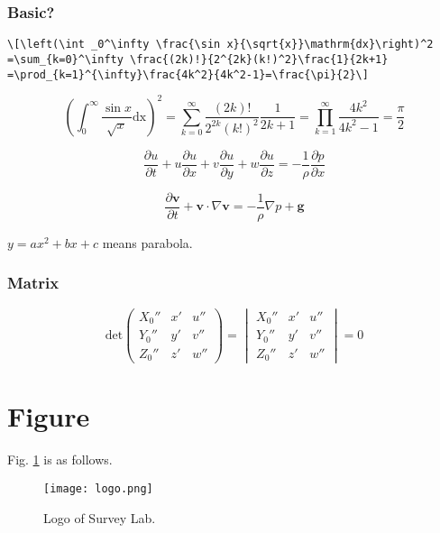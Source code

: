 \documentclass[english,a4paper]{jsarticle}
\begin{document}
\subsubsection{Basic?}
\begin{verbatim}
\[\left(\int _0^\infty \frac{\sin x}{\sqrt{x}}\mathrm{dx}\right)^2
=\sum_{k=0}^\infty \frac{(2k)!}{2^{2k}(k!)^2}\frac{1}{2k+1}
=\prod_{k=1}^{\infty}\frac{4k^2}{4k^2-1}=\frac{\pi}{2}\]
\end{verbatim}
\[\left(\int _0^\infty \frac{\sin x}{\sqrt{x}}\mathrm{dx}\right)^2
=\sum_{k=0}^\infty \frac{(2k)!}{2^{2k}(k!)^2}\frac{1}{2k+1}
=\prod_{k=1}^{\infty}\frac{4k^2}{4k^2-1}=\frac{\pi}{2}\]

\[\frac{\partial u}{\partial t}
+u\frac{\partial u}{\partial x}+v\frac{\partial u}{\partial y}
+w\frac{\partial u}{\partial z}
=-\frac{1}{\rho}\frac{\partial p}{\partial x}\]

\[\frac{\partial \bm{v}}{\partial t}+\bm{v}\cdot \nabla\bm{v}
=-\frac{1}{\rho}\nabla p+\bm{g}\]

$y=ax^2+bx+c$ means parabola.

\subsubsection{Matrix}
\begin{equation}
\mathrm{det}\begin{pmatrix}
X_0'' & x' & u'' \\
Y_0'' & y' & v'' \\
Z_0'' & z' & w''
\end{pmatrix}
=
\begin{vmatrix}
X_0'' & x' & u'' \\
Y_0'' & y' & v'' \\
Z_0'' & z' & w''
\end{vmatrix}
=0
\end{equation}

\newpage

\section{Figure}
Fig. \ref{fig:logo} is as follows.
\begin{figure}[H]
	\centering
	\graphicspath{{graphics/}}
	\texttt{[image: logo.png]}
	\caption{Logo of Survey Lab.}
	\label{fig:logo}
\end{figure}%
\end{document}
